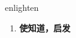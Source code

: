 
\begin{frame}
{\huge enlighten}
\begin{center}
\begin{enumerate}\Large
  \item \textbf{使知道，启发}
\end{enumerate}
\end{center}
\end{frame}
